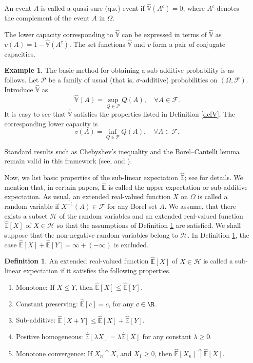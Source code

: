 \documentclass[12pt]{article}
\theoremstyle{definition}
\newtheorem{definition}[theorem]{Definition}
\newtheorem{example}[theorem]{Example}
\theoremstyle{remark}
\numberwithin{equation}{section}
\def\Eh{{\hat{\mathbb{E}}}}
\def\Vh{{\hat{\mathbb{V}}}}
\def\PD{{\mathcal P}}                     \def\PDW{{\tilde{\cal P}}}
\def\FD{{\mathcal F}}                     \def\GD{{\cal G}}
\def\HD{{\mathcal H}}
\begin{document}
An event $A$ is called a quasi-sure (q.s.) event if $\Vh(A^c)=0$, 
where $A^{c}$ denotes the complement of the event $A$ in $\Omega$.

The lower capacity corresponding to $\Vh$ can be expressed in terms of $\Vh$ as $v(A) = 1 - \Vh(A^{c})$.
The set functions $\Vh$ and $v$ form a pair of conjugate capacities.

\begin{example}  \label{exmplV}
The basic method for obtaining a sub-additive probability is as follows.
Let $\mathcal{P}$ be a family of usual (that is, $\sigma$-additive) probabilities on $(\Omega, \FD)$. 
Introduce $\Vh$ as
\begin{equation}  \label{Vsup}
\Vh(A) = \sup_{Q \in \PD} Q(A), \quad \forall A \in \FD.
\end{equation}
It is easy to see that $\Vh$ satisfies the properties listed in Definition \ref{defV}.
The corresponding lower capacity is 
\begin{equation*}  
v(A) = \inf_{Q \in \PD} Q(A), \quad \forall A \in \FD.
\end{equation*}
\end{example}
Standard results such as Chebyshev’s inequality and the Borel–Cantelli lemma remain valid in this framework (see, \cite{ChenZ2013} and \cite{Peng2019}).



Now, we list basic properties of the sub-linear expectation $\Eh$; see \cite{Peng2019} for details.
We mention that, in certain papers, $\Eh$ is called the upper expectation or sub-additive expectation.
As usual, an extended real-valued function $X$ on $\Omega$ is called a random variable if
$X^{-1}(A) \in \FD$ for any Borel set $A$.
We assume, that there exists a subset $\HD$ of the random variables and
an extended real-valued function $\Eh[X]$ of $X\in \HD$ 
so that the assumptions of Definition \ref{defE} are satisfied.
We shall suppose that the non-negative random variables belong to $\HD$.
In Definition \ref{defE}, the case $ \Eh[X] + \Eh[Y]= \infty + (-\infty)$ is excluded.

\begin{definition} \label{defE}
An extended real-valued function $\Eh[X]$ of $X\in \HD$ is called a sub-linear expectation if
it satisfies the following properties.
\begin{enumerate}
    \item Monotone: If $X \leq Y$, then $\Eh[X] \leq \Eh[Y]$.
    \item Constant preserving: $\Eh[c] = c$, for any $c \in \R$.
    \item Sub-additive: $\Eh[X+Y] \leq \Eh[X] + \Eh[Y]$.
    \item Positive homogeneous: $\Eh[\lambda X] = \lambda \Eh[X]$ for any constant $\lambda \geq 0$.
    \item Monotone convergence: If $X_n \uparrow X$, and $X_1\ge 0$,  then $\Eh[X_n] \uparrow \Eh[X]$.
\end{enumerate}
\end{definition}
\end{document}
